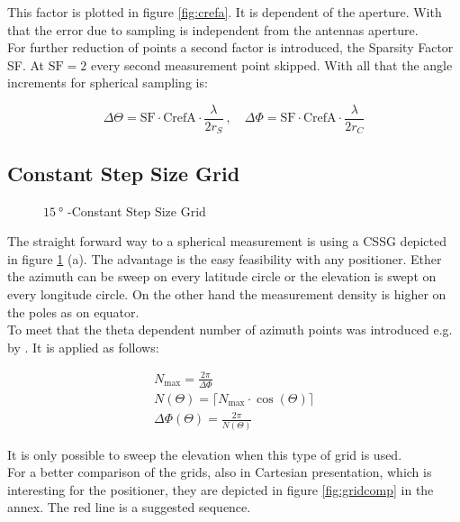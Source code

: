 This factor is plotted in figure \ref{fig:crefa}. It is dependent of the aperture. With that the error due to sampling is independent from the antennas aperture.\\
For further reduction of points a second factor is introduced, the Sparsity Factor SF. At $\text{SF}=2$ every second measurement point skipped. With all that the angle increments for spherical sampling is:

\begin{equation}
\Delta\Theta = \text{SF}\cdot\text{CrefA}\cdot\frac{\lambda}{2r_S}\ ,\quad\Delta\Phi = \text{SF}\cdot\text{CrefA}\cdot\frac{\lambda}{2r_C}
\end{equation}

\subsection{Constant Step Size Grid}


\begin{figure}[h]
  \centering
  \centering
\caption{$\SI{15}{\degree}$ -Constant Step Size Grid}
\label{fig:cssg}
\end{figure}

The straight forward way to a spherical measurement is using a \ac{CSSG} depicted in figure \ref{fig:cssg} (a). The advantage is the easy feasibility with any positioner. Ether the azimuth can be sweep on every latitude circle or the elevation is swept on every longitude circle. On the other hand the measurement density is higher on the poles as on equator.\\
To meet that the theta dependent number of azimuth points was introduced e.g. by \cite{ctiaat}. It is applied as follows:

\begin{align}
N_{\text{max}} = \frac{2\pi}{\Delta\Phi}\\
N\left(\Theta\right)=\lceil N_{\text{max}}\cdot\cos\left(\Theta\right)\rceil\\
\Delta\Phi\left(\Theta\right) = \frac{2\pi}{N\left(\Theta\right)}
\end{align}

It is only possible to sweep the elevation when this type of grid is used.\\
For a better comparison of the grids, also in Cartesian presentation, which is interesting for the positioner, they are depicted in figure \ref{fig:gridcomp} in the annex. The red line is a suggested sequence.

